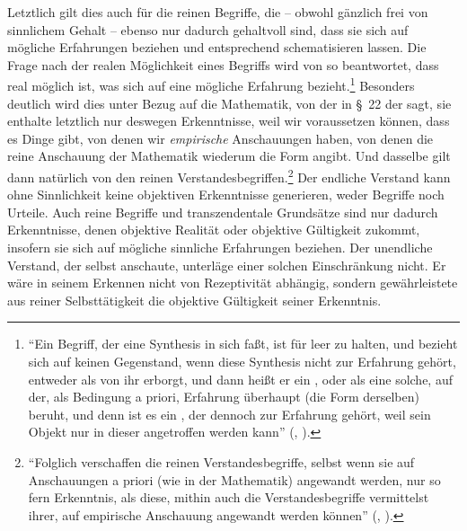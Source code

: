 Letztlich gilt dies auch für die reinen Begriffe, die -- obwohl gänzlich frei
von sinnlichem Gehalt -- ebenso nur dadurch gehaltvoll sind, dass sie sich auf
mögliche Erfahrungen beziehen und entsprechend schematisieren lassen. Die Frage
nach der realen Möglichkeit eines Begriffs wird von  so
beantwortet, dass real möglich ist, was sich auf eine mögliche Erfahrung
bezieht.\footnote{\enquote{Ein Begriff, der eine Synthesis in sich faßt, ist
für leer zu halten, und bezieht sich auf keinen Gegenstand, wenn diese
Synthesis nicht zur Erfahrung gehört, entweder als von ihr erborgt, und dann
heißt er ein , oder als eine solche, auf der, als
Bedingung a priori, Erfahrung überhaupt (die Form derselben) beruht, und denn
ist es ein , der dennoch zur Erfahrung gehört, weil sein
Objekt nur in dieser angetroffen werden kann}
\mkbibparens{\cite[][B 267]{Kant:KritikderreinenVernunft2003},
\cite[][III: 186.29--35]{Kant:GesammelteWerke1900ff.}}.}
Besonders deutlich wird dies unter Bezug auf die Mathematik, von der
 in \S~22 der  sagt, sie enthalte letztlich nur
deswegen Erkenntnisse, weil wir voraussetzen können, dass es Dinge gibt, von
denen wir \emph{empirische} Anschauungen haben, von denen die reine Anschauung
der Mathematik wiederum die Form angibt. Und dasselbe gilt dann natürlich von
den reinen
Verstandesbegriffen.\footnote{\enquote{Folglich verschaffen die reinen Verstandesbegriffe, selbst wenn sie auf
Anschauungen a priori (wie in der Mathematik) angewandt werden, nur so fern
Erkenntnis, als diese, mithin auch die Verstandesbegriffe vermittelst ihrer, auf
empirische Anschauung angewandt werden können}
\mkbibparens{\cite[][\S~22]{Kant:KritikderreinenVernunft2003},
\cite[][III: 117.22--26]{Kant:GesammelteWerke1900ff.}}.}
Der endliche Verstand kann ohne Sinnlichkeit keine objektiven Erkenntnisse
generieren, weder Begriffe noch Urteile. Auch reine Begriffe und transzendentale
Grundsätze sind nur dadurch Erkenntnisse, denen objektive Realität oder
objektive Gültigkeit zukommt, insofern sie sich auf mögliche sinnliche Erfahrungen beziehen.
Der unendliche Verstand, der selbst anschaute, unterläge einer solchen
Einschränkung nicht. Er wäre in seinem Erkennen nicht von Rezeptivität
abhängig, sondern gewährleistete aus reiner Selbsttätigkeit die
objektive Gültigkeit seiner Erkenntnis.

